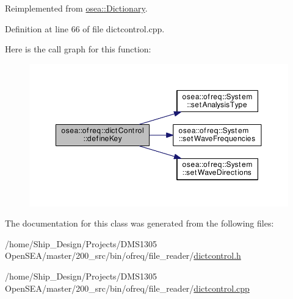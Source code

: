 Reimplemented from \hyperlink{classosea_1_1_dictionary_ae96470181c8b1762204493fa45e96d7c}{osea\-::\-Dictionary}.



Definition at line 66 of file dictcontrol.\-cpp.



Here is the call graph for this function\-:\nopagebreak
\begin{figure}[H]
\begin{center}
\leavevmode
\includegraphics[width=350pt]{classosea_1_1ofreq_1_1dict_control_a048421f7c1bc9b8a023a159c59407bb9_cgraph}
\end{center}
\end{figure}




The documentation for this class was generated from the following files\-:\begin{DoxyCompactItemize}
\item 
/home/\-Ship\-\_\-\-Design/\-Projects/\-D\-M\-S1305 Open\-S\-E\-A/master/200\-\_\-src/bin/ofreq/file\-\_\-reader/\hyperlink{dictcontrol_8h}{dictcontrol.\-h}\item 
/home/\-Ship\-\_\-\-Design/\-Projects/\-D\-M\-S1305 Open\-S\-E\-A/master/200\-\_\-src/bin/ofreq/file\-\_\-reader/\hyperlink{dictcontrol_8cpp}{dictcontrol.\-cpp}\end{DoxyCompactItemize}
